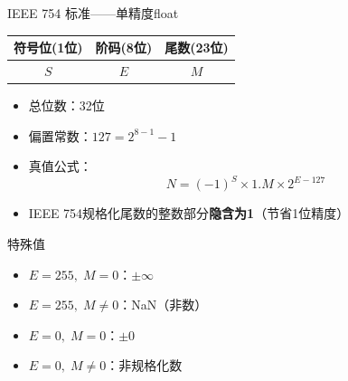 \documentclass[10pt, aspectratio=169]{beamer}
\begin{document}
\begin{frame}{IEEE 754 标准——单精度float}
    \begin{center}
        \begin{tabular}{|c|c|c|}
            \hline
            符号位(1位) & 阶码(8位) & 尾数(23位) \\
            \hline
            $S$ & $E$ & $M$ \\
            \hline
        \end{tabular}
    \end{center}
    \vspace{0.5em}
    \begin{itemize}
        \item 总位数：32位
        \item 偏置常数：$127 = 2^{8-1} - 1$
        \item 真值公式：
        \[
            N = (-1)^S \times 1.M \times 2^{E-127}
        \]
        \item IEEE 754规格化尾数的整数部分\textbf{隐含为1}（节省1位精度）
    \end{itemize}
    \vspace{0.3em}
    \begin{block}{特殊值}
        \begin{itemize}
            \item $E=255,\; M=0$：$\pm\infty$
            \item $E=255,\; M \neq 0$：NaN（非数）
            \item $E=0,\; M=0$：$\pm 0$
            \item $E=0,\; M \neq 0$：非规格化数
        \end{itemize}
    \end{block}
\end{frame}
\end{document}
